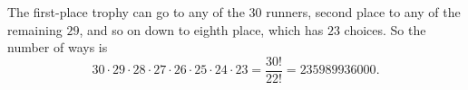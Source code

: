 The first-place trophy can go to any of the $30$ runners, second place to any of the remaining $29$, and so on down to eighth place, which has $23$ choices. So the number of ways is
\[
30\cdot29\cdot28\cdot27\cdot26\cdot25\cdot24\cdot23=\dfrac{30!}{22!}=\boxed{235989936000}.
\]
